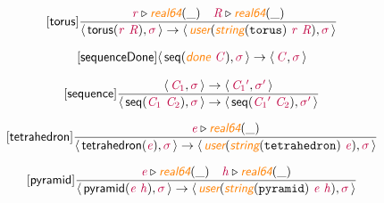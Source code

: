 \documentclass[10pt,leqno,fleqn]{article}
\newcommand{\artVariable}[1]{\mbox{\color{purple}\em #1\/}}
\newcommand{\artConstructor}[1]{\mbox{\sf #1}}
\newcommand{\artCaseInsensitiveLiteral}[1]{\mbox{\tt #1}}
\newcommand{\artSpecial}[1]{\mbox{\color{orange}\sf\em #1}}
\begin{document}
\begin{equation}
\tag*{[\artConstructor{\sf torus}]}
\begin{split}\frac{ \artVariable{r}\triangleright \artSpecial{real64}(\_) \quad  \artVariable{R}\triangleright \artSpecial{real64}(\_) }{\langle\, \artConstructor{\sf torus}(\artVariable{r}\ \artVariable{R}), \artVariable{$\sigma$}\,\rangle \rightarrow \langle\, \artSpecial{user}(\artSpecial{string}(\artCaseInsensitiveLiteral{torus})\ \artVariable{r}\ \artVariable{R}), \artVariable{$\sigma$}\,\rangle }
\end{split}
\end{equation}

\begin{equation}
\tag*{[\artConstructor{\sf sequenceDone}]}
\begin{split}\langle\, \artConstructor{\sf seq}(\artSpecial{done}\ \artVariable{C}), \artVariable{$\sigma$}\,\rangle \rightarrow \langle\, \artVariable{C}, \artVariable{$\sigma$}\,\rangle 
\end{split}
\end{equation}

\begin{equation}
\tag*{[\artConstructor{\sf sequence}]}
\begin{split}\frac{\langle\, \artVariable{C$_{1}$}, \artVariable{$\sigma$}\,\rangle \rightarrow \langle\, \artVariable{C$_{1}$\/$^\prime$}, \artVariable{$\sigma$\/$^\prime$}\,\rangle }{\langle\, \artConstructor{\sf seq}(\artVariable{C$_{1}$}\ \artVariable{C$_{2}$}), \artVariable{$\sigma$}\,\rangle \rightarrow \langle\, \artConstructor{\sf seq}(\artVariable{C$_{1}$\/$^\prime$}\ \artVariable{C$_{2}$}), \artVariable{$\sigma$\/$^\prime$}\,\rangle }
\end{split}
\end{equation}

\begin{equation}
\tag*{[\artConstructor{\sf tetrahedron}]}
\begin{split}\frac{ \artVariable{e}\triangleright \artSpecial{real64}(\_) }{\langle\, \artConstructor{\sf tetrahedron}(\artVariable{e}), \artVariable{$\sigma$}\,\rangle \rightarrow \langle\, \artSpecial{user}(\artSpecial{string}(\artCaseInsensitiveLiteral{tetrahedron})\ \artVariable{e}), \artVariable{$\sigma$}\,\rangle }
\end{split}
\end{equation}

\begin{equation}
\tag*{[\artConstructor{\sf pyramid}]}
\begin{split}\frac{ \artVariable{e}\triangleright \artSpecial{real64}(\_) \quad  \artVariable{h}\triangleright \artSpecial{real64}(\_) }{\langle\, \artConstructor{\sf pyramid}(\artVariable{e}\ \artVariable{h}), \artVariable{$\sigma$}\,\rangle \rightarrow \langle\, \artSpecial{user}(\artSpecial{string}(\artCaseInsensitiveLiteral{pyramid})\ \artVariable{e}\ \artVariable{h}), \artVariable{$\sigma$}\,\rangle }
\end{split}
\end{equation}
\end{document}
